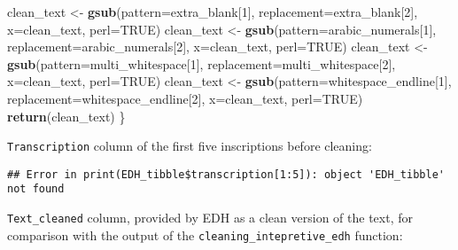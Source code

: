 \documentclass[]{article}
\newenvironment{Shaded}{\begin{snugshade}}{\end{snugshade}}
\newcommand{\DataTypeTok}[1]{\textcolor[rgb]{0.13,0.29,0.53}{#1}}
\newcommand{\DecValTok}[1]{\textcolor[rgb]{0.00,0.00,0.81}{#1}}
\newcommand{\KeywordTok}[1]{\textcolor[rgb]{0.13,0.29,0.53}{\textbf{#1}}}
\newcommand{\NormalTok}[1]{#1}
\newcommand{\OperatorTok}[1]{\textcolor[rgb]{0.81,0.36,0.00}{\textbf{#1}}}
\newcommand{\OtherTok}[1]{\textcolor[rgb]{0.56,0.35,0.01}{#1}}
\newcommand{\StringTok}[1]{\textcolor[rgb]{0.31,0.60,0.02}{#1}}
\begin{document}
\begin{Shaded}
\begin{Highlighting}[]
\NormalTok{   clean_text <-}\StringTok{ }\KeywordTok{gsub}\NormalTok{(}\DataTypeTok{pattern=}\NormalTok{extra_blank[}\DecValTok{1}\NormalTok{], }\DataTypeTok{replacement=}\NormalTok{extra_blank[}\DecValTok{2}\NormalTok{], }\DataTypeTok{x=}\NormalTok{clean_text, }\DataTypeTok{perl=}\OtherTok{TRUE}\NormalTok{)}
\NormalTok{   clean_text <-}\StringTok{ }\KeywordTok{gsub}\NormalTok{(}\DataTypeTok{pattern=}\NormalTok{arabic_numerals[}\DecValTok{1}\NormalTok{], }\DataTypeTok{replacement=}\NormalTok{arabic_numerals[}\DecValTok{2}\NormalTok{], }\DataTypeTok{x=}\NormalTok{clean_text, }\DataTypeTok{perl=}\OtherTok{TRUE}\NormalTok{)}
\NormalTok{   clean_text <-}\StringTok{ }\KeywordTok{gsub}\NormalTok{(}\DataTypeTok{pattern=}\NormalTok{multi_whitespace[}\DecValTok{1}\NormalTok{], }\DataTypeTok{replacement=}\NormalTok{multi_whitespace[}\DecValTok{2}\NormalTok{], }\DataTypeTok{x=}\NormalTok{clean_text, }\DataTypeTok{perl=}\OtherTok{TRUE}\NormalTok{)}
\NormalTok{   clean_text <-}\StringTok{ }\KeywordTok{gsub}\NormalTok{(}\DataTypeTok{pattern=}\NormalTok{whitespace_endline[}\DecValTok{1}\NormalTok{], }\DataTypeTok{replacement=}\NormalTok{whitespace_endline[}\DecValTok{2}\NormalTok{], }\DataTypeTok{x=}\NormalTok{clean_text, }\DataTypeTok{perl=}\OtherTok{TRUE}\NormalTok{)}
      \KeywordTok{return}\NormalTok{(clean_text)}
\NormalTok{\}}
\end{Highlighting}
\end{Shaded}

\texttt{Transcription} column of the first five inscriptions before
cleaning:

\begin{Shaded}
\end{Shaded}

\begin{verbatim}
## Error in print(EDH_tibble$transcription[1:5]): object 'EDH_tibble' not found
\end{verbatim}

\texttt{Text\_cleaned} column, provided by EDH as a clean version of the
text, for comparison with the output of the
\texttt{cleaning\_intepretive\_edh} function:

\begin{Shaded}
\end{Shaded}
\end{document}
